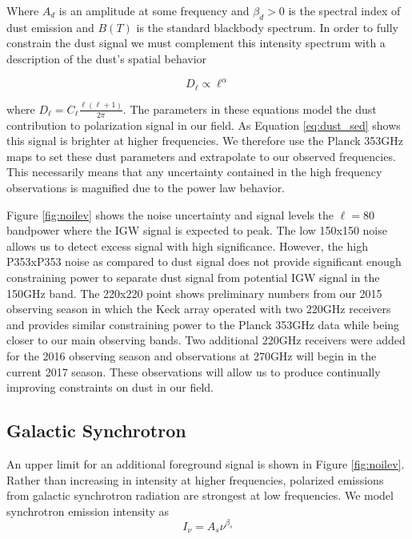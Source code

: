 \documentclass[12pt]{article}
\begin{document}
Where $A_d$ is an amplitude at some frequency and $\beta _d > 0$ is the spectral
index of dust emission and $B(T)$ is the standard blackbody spectrum. In order
to fully constrain the dust signal we must complement this intensity
spectrum with a description of the dust's spatial behavior

\begin{equation}
	D_\ell \propto \ell^\alpha
	\label{eq:dust_aps}
\end{equation}

where $D_\ell=C_\ell \frac{\ell(\ell +1)}{2\pi}$. The parameters in these
equations model the dust contribution to polarization signal in our field. As
Equation \ref{eq:dust_sed} shows this signal is brighter at higher
frequencies. We therefore use the Planck 353GHz maps to set these dust
parameters and extrapolate to our observed frequencies. This necessarily means
that any uncertainty contained in the high frequency observations is magnified
due to the power law behavior.

Figure \ref{fig:noilev} shows the noise uncertainty and signal levels
the $\ell=80$ bandpower where the IGW signal is expected to peak. The low 150x150
noise allows us to detect excess signal with high significance. However, the high P353xP353
noise as compared to dust signal does not provide significant enough
constraining power to separate dust signal from potential IGW signal in the
150GHz band. The 220x220 point shows preliminary numbers from our 2015
observing season in which the Keck array operated with two 220GHz receivers
and provides similar constraining power to the Planck 353GHz data while being
closer to our main observing bands. Two additional 220GHz receivers were added
for the 2016 observing season and observations at 270GHz will begin in the
current 2017 season. These observations will allow us to produce continually
improving constraints on dust in our field.
\subsection{Galactic Synchrotron}
An upper limit for an additional foreground signal is shown in Figure
\ref{fig:noilev}. Rather than increasing in intensity at higher frequencies,
polarized emissions from galactic synchrotron radiation are strongest at low
frequencies. We model synchrotron emission intensity as
\begin{equation}
	I_\nu = A_s \nu^{\beta _s}
	\label{eq:synch_sed}
\end{equation}
\end{document}
